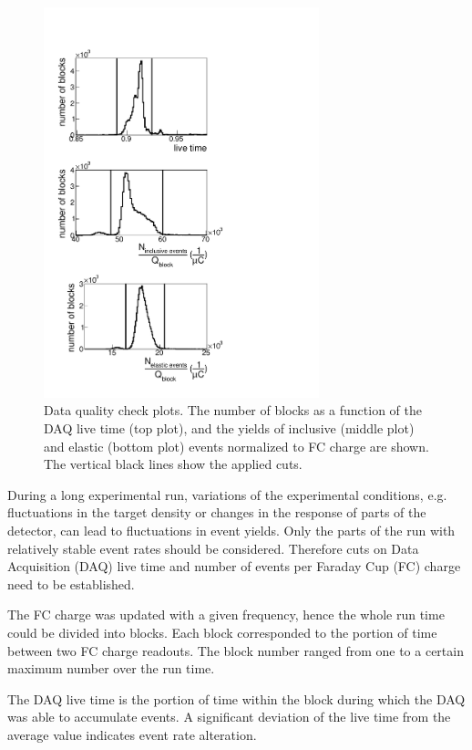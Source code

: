 \documentclass[prc,twocolumn,superscriptaddress,showpacs,amssymb,amsmath,amsfonts,aps,nofootinbib]{revtex4-1}
\begin{document}
\begin{figure}[htp]
\begin{center}
 \includegraphics[width=8cm,keepaspectratio]{pictures/qcheck/qcheck1d.pdf} 
\vspace{-0.1cm}
\caption{Data quality check plots. The number of blocks as a function of the DAQ live time (top plot), and  the yields of inclusive (middle plot) and elastic (bottom plot) events  normalized to FC charge are shown. The vertical black  lines show the applied cuts.}
\label{fig:qcheck}
\end{center}
\end{figure} 


During a long experimental run, variations of the experimental conditions, e.g. fluctuations in the target density or changes in the response of parts of the detector, can lead to fluctuations in event yields.
 Only the parts of the run with relatively stable event rates should be considered.
Therefore cuts on Data Acquisition (DAQ) live time and number of events per Faraday Cup (FC) charge need to be established. 

The FC charge was updated with a given frequency, hence the whole run time could be divided into blocks. Each block corresponded to the portion of time between two FC charge readouts. The block number ranged from one to a certain maximum number over the run time. 


The DAQ live time is the portion of time within the block during which the DAQ was able to accumulate events. A significant deviation of the live time from the average value indicates event rate alteration. 
\end{document}
